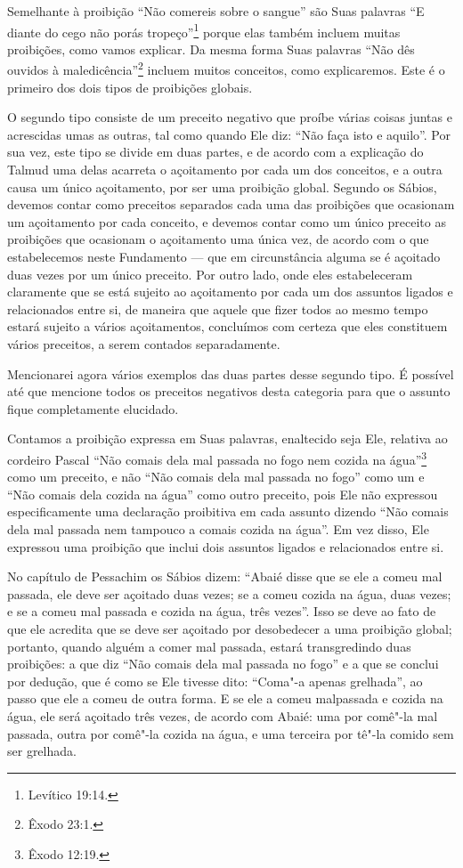 Semelhante à proibição ``Não comereis sobre o sangue'' são Suas
palavras ``E diante do cego não porás tropeço''\footnote{Levítico 19:14.} porque
elas também incluem muitas proibições, como vamos explicar. Da mesma
forma Suas palavras ``Não dês ouvidos à maledicência''\footnote{Êxodo 23:1.}
incluem muitos conceitos, como explicaremos. Este é o primeiro dos dois
tipos de proibições globais.

O segundo tipo consiste de um preceito negativo que proíbe várias coisas
juntas e acrescidas umas as outras, tal como quando Ele diz: ``Não faça
isto e aquilo''. Por sua vez, este tipo se divide em duas partes, e de
acordo com a explicação do Talmud\starr{} uma delas acarreta o açoitamento por
cada um dos conceitos, e a outra causa um único açoitamento, por ser
uma proibição global. Segundo os Sábios, devemos contar como preceitos
separados cada uma das proibições que ocasionam um açoitamento por cada
conceito, e devemos contar como um único preceito as proibições que
ocasionam o açoitamento uma única vez, de acordo com o que estabelecemos
neste Fundamento --- que em circunstância alguma se é açoitado duas
vezes por um único preceito. Por outro lado, onde eles estabeleceram
claramente que se está sujeito ao açoitamento por cada um dos assuntos
ligados e relacionados entre si, de maneira que aquele que fizer todos
ao mesmo tempo estará sujeito a vários açoitamentos, concluímos com
certeza que eles constituem vários preceitos, a serem contados
separadamente.

Mencionarei agora vários exemplos das duas partes desse segundo tipo. É
possível até que mencione todos os preceitos negativos desta categoria
para que o assunto fique completamente elucidado.

Contamos a proibição expressa em Suas palavras, enaltecido seja Ele,
relativa ao cordeiro Pascal ``Não comais dela mal passada no fogo nem
cozida na água''\footnote{Êxodo 12:19.} como um preceito, e não ``Não comais dela
mal passada no fogo'' como um e ``Não comais dela cozida na água'' como
outro preceito, pois Ele não expressou especificamente uma declaração
proibitiva em cada assunto dizendo ``Não comais dela mal passada nem
tampouco a comais cozida na água''. Em vez disso, Ele expressou uma
proibição que inclui dois assuntos ligados e relacionados entre si.

No capítulo de Pessachim\starr{} os Sábios dizem: ``Abaié\starr{} disse que se ele a
comeu mal passada, ele deve ser açoitado duas vezes; se a comeu cozida
na água, duas vezes; e se a comeu mal passada e cozida na água, três
vezes''. Isso se deve ao fato de que ele acredita que se deve ser
açoitado por desobedecer a uma proibição global; portanto, quando alguém
a comer mal passada, estará transgredindo duas proibições: a que diz
``Não comais dela mal passada no fogo'' e a que se conclui por dedução,
que é como se Ele tivesse dito: ``Coma"-a apenas grelhada'', ao passo que
ele a comeu de outra forma. E se ele a comeu malpassada e cozida na
água, ele será açoitado três vezes, de acordo com Abaié\starr: uma por
comê"-la mal passada, outra por comê"-la cozida na água, e uma terceira
por tê"-la comido sem ser grelhada.

